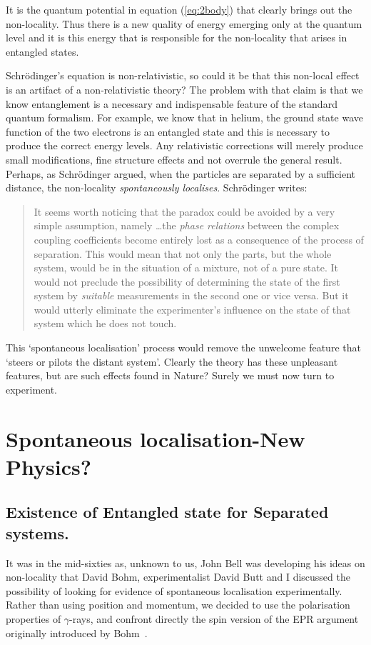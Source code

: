 \documentclass[11pt]{article}
\begin{document}
It is the quantum potential in equation (\ref{eq:2body}) that clearly brings out the non-locality.  Thus there is a new quality of energy emerging only at the quantum level and it is this energy that is responsible for the non-locality that arises in entangled states.


 Schr\"{o}dinger's equation is non-relativistic, so could it be that this non-local effect is an artifact of a non-relativistic theory?
The problem with that claim is that  we know entanglement is a necessary and indispensable feature of the standard quantum formalism. For example, we know that in helium, the ground state wave function of the two electrons is an entangled state and this is necessary to produce the correct energy levels.   Any relativistic corrections will merely produce small modifications, fine structure effects and not overrule the general result.  Perhaps, as Schr\"{o}dinger argued, when the particles are separated by a sufficient distance, the non-locality {\em spontaneously localises}.  Schr\"{o}dinger writes:
\begin{quote}
 It seems worth noticing that the paradox could be avoided by a very simple assumption, namely \dots the
{\em phase relations} between the complex coupling coefficients become entirely lost as a consequence of the process of separation. This would mean that not only the parts, but the whole system, would be in the situation of a mixture, not of a pure state. It would not preclude the possibility of determining the state of the first system by {\em suitable} measurements in the second one or vice versa. But it would utterly eliminate the experimenter's influence on the state of that system which he does not touch.
\end{quote}
This `spontaneous localisation' process would remove the unwelcome feature that `steers or pilots the distant system'.
Clearly the theory has these unpleasant features, but are such effects found in Nature?  Surely we must now turn to experiment.  

\section{Spontaneous localisation-New Physics?}

\subsection{Existence of Entangled state for Separated systems.}

It was in the mid-sixties as, unknown to us, John Bell was developing his ideas on non-locality that David Bohm, experimentalist David Butt and I discussed the possibility of looking for evidence of spontaneous localisation experimentally.  Rather than using position and momentum, we decided to use the polarisation properties of $\gamma$-rays, and confront directly the spin version of the EPR argument originally introduced by Bohm~\cite{db51}.
\end{document}
